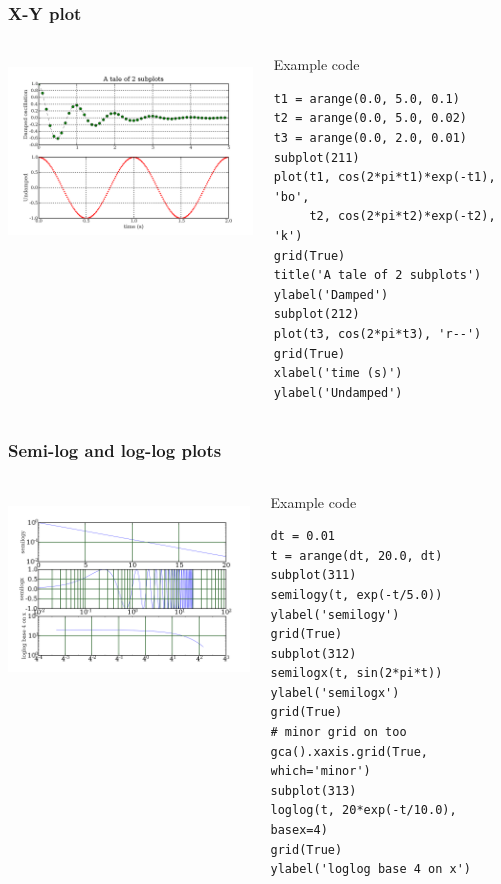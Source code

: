\documentclass[14pt,compress]{beamer}
\newcounter{time}
\begin{document}

\begin{frame}[fragile]
  \frametitle{X-Y plot}
  \begin{columns}
    \hspace*{-0.5in}
    \includegraphics[height=2in, interpolate=true]{data/xyplot}
    \begin{block}{Example code}
    \tiny
\begin{lstlisting}
t1 = arange(0.0, 5.0, 0.1)
t2 = arange(0.0, 5.0, 0.02)
t3 = arange(0.0, 2.0, 0.01)
subplot(211)
plot(t1, cos(2*pi*t1)*exp(-t1), 'bo', 
     t2, cos(2*pi*t2)*exp(-t2), 'k')
grid(True)
title('A tale of 2 subplots')
ylabel('Damped')
subplot(212)
plot(t3, cos(2*pi*t3), 'r--')
grid(True)
xlabel('time (s)')
ylabel('Undamped')
\end{lstlisting}
    \end{block}
  \end{columns}
\end{frame}

\begin{frame}[fragile] \frametitle{Semi-log and log-log plots}
  \begin{columns}
    \hspace*{-0.5in}
  \includegraphics[height=2in, interpolate=true]{data/log}  
    \begin{block}{Example code}
    \tiny
\begin{lstlisting}
dt = 0.01
t = arange(dt, 20.0, dt)
subplot(311)
semilogy(t, exp(-t/5.0))
ylabel('semilogy')
grid(True)
subplot(312)
semilogx(t, sin(2*pi*t))
ylabel('semilogx')
grid(True)
# minor grid on too
gca().xaxis.grid(True, which='minor')  
subplot(313)
loglog(t, 20*exp(-t/10.0), basex=4)
grid(True)
ylabel('loglog base 4 on x')
\end{lstlisting}
  \end{block}
\end{columns}
\end{frame}
\end{document}
